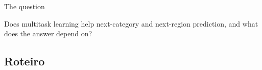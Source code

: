 \documentclass{beamer}
\begin{document}
\begin{frame}{The question}

    {\Large Does multitask learning help next-category and next-region prediction,
    and what does the answer depend on?\par}

\end{frame}

\subsection{Roteiro}
\end{document}
